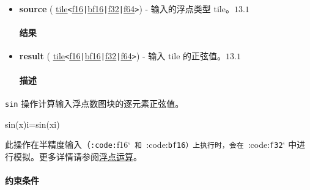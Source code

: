\documentclass{article}
\begin{document}
\begin{itemize}
\item \textbf{source} ( \href{https://docs.nvidia.com/cuda/tile-ir/latest/sections/types.html#type-tile}{tile}\texttt{<}\href{https://docs.nvidia.com/cuda/tile-ir/latest/sections/types.html#subsection-element-types}{f16}\texttt{|}\href{https://docs.nvidia.com/cuda/tile-ir/latest/sections/types.html#subsection-element-types}{bf16}\texttt{|}\href{https://docs.nvidia.com/cuda/tile-ir/latest/sections/types.html#subsection-element-types}{f32}\texttt{|}\href{https://docs.nvidia.com/cuda/tile-ir/latest/sections/types.html#subsection-element-types}{f64}\texttt{>}) - 输入的浮点类型 tile。$\boxed{13.1}$




\paragraph{结果}


\item \textbf{result} ( \href{https://docs.nvidia.com/cuda/tile-ir/latest/sections/types.html#type-tile}{tile}\texttt{<}\href{https://docs.nvidia.com/cuda/tile-ir/latest/sections/types.html#subsection-element-types}{f16}\texttt{|}\href{https://docs.nvidia.com/cuda/tile-ir/latest/sections/types.html#subsection-element-types}{bf16}\texttt{|}\href{https://docs.nvidia.com/cuda/tile-ir/latest/sections/types.html#subsection-element-types}{f32}\texttt{|}\href{https://docs.nvidia.com/cuda/tile-ir/latest/sections/types.html#subsection-element-types}{f64}\texttt{>}) - 输入 tile 的正弦值。$\boxed{13.1}$




\paragraph{描述}


\end{itemize}
\texttt{sin} 操作计算输入浮点数图块的逐元素正弦值。



sin(x)i=sin(xi)


此操作在半精度输入（\texttt{:code:}f16`\texttt{ 和 }:code:\texttt{bf16}\texttt{）上执行时，会在 }:code:\texttt{f32}` 中进行模拟。更多详情请参阅\href{https://docs.nvidia.com/cuda/tile-ir/latest/sections/operations.html#op-group-floating-point}{浮点运算}。





\paragraph{约束条件}
\end{document}
